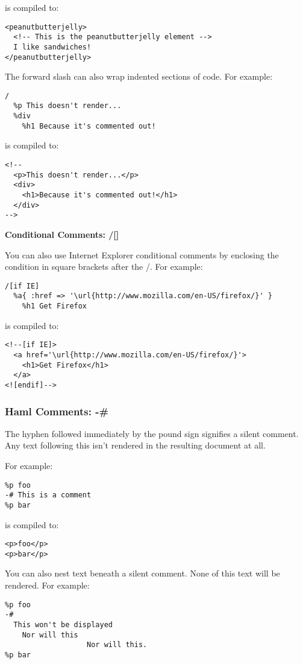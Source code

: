 \documentclass[10pt]{article}
\begin{document}
 is compiled to:
\begin{verbatim}
<peanutbutterjelly>
  <!-- This is the peanutbutterjelly element -->
  I like sandwiches!
</peanutbutterjelly>
\end{verbatim}


 The forward slash can also wrap indented sections of code. For example:
\begin{verbatim}
/
  %p This doesn't render...
  %div
    %h1 Because it's commented out!
\end{verbatim}


 is compiled to:
\begin{verbatim}
<!--
  <p>This doesn't render...</p>
  <div>
    <h1>Because it's commented out!</h1>
  </div>
-->
\end{verbatim}
\textbf{Conditional Comments: /[]}


 You can also use Internet Explorer conditional comments by enclosing the condition in square brackets after the /. For example:
\begin{verbatim}
/[if IE]
  %a{ :href => '\url{http://www.mozilla.com/en-US/firefox/}' }
    %h1 Get Firefox
\end{verbatim}


 is compiled to:
\begin{verbatim}
<!--[if IE]>
  <a href='\url{http://www.mozilla.com/en-US/firefox/}'>
    <h1>Get Firefox</h1>
  </a>
<![endif]-->
\end{verbatim}
\subsubsection*{Haml Comments: -\#}


 The hyphen followed immediately by the pound sign signifies a silent comment. Any text following this isn’t rendered in the resulting document at all.


 For example:
\begin{verbatim}
%p foo
-# This is a comment
%p bar
\end{verbatim}


 is compiled to:
\begin{verbatim}
<p>foo</p>
<p>bar</p>
\end{verbatim}


 You can also nest text beneath a silent comment. None of this text will be rendered. For example:
\begin{verbatim}
%p foo
-#
  This won't be displayed
    Nor will this
                   Nor will this.
%p bar
\end{verbatim}
\end{document}
